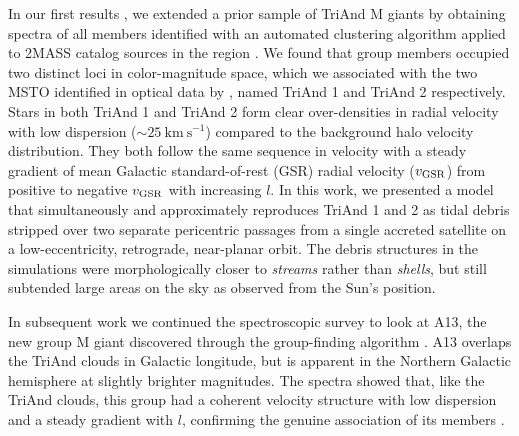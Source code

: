 \documentclass[galaxies,article,submit,moreauthors,pdftex,10pt,a4paper]{mdpi}
\newcommand{\kms}{\mathrm{km}~\mathrm{s}^{-1}}
\begin{document}
In our first results \cite{sheffield14}, we extended a prior sample of TriAnd
M giants \cite{rochapinto04} by obtaining spectra of all members identified
with an automated clustering algorithm applied to 2MASS catalog sources in the
region \cite{sharma10}.
We found that group members occupied two distinct loci in color-magnitude space, which we associated with the two MSTO identified in optical data by \cite{martin07}, named TriAnd 1 and TriAnd 2 respectively.
Stars in both TriAnd 1 and TriAnd 2  form  clear over-densities in radial velocity with low dispersion ($\sim 25~\kms$) compared to the background halo velocity distribution.
They both follow the same  sequence in velocity with a steady gradient of mean Galactic standard-of-rest (GSR) radial velocity ($v_{\rm GSR}$) from positive to negative $v_{\rm GSR}$ with increasing $l$.
In this work, we presented a model that simultaneously and approximately reproduces TriAnd 1 and 2 as tidal debris stripped over two separate pericentric passages from a single accreted satellite on a low-eccentricity, retrograde, near-planar orbit.
The debris structures in the simulations were morphologically closer to {\it streams} rather
than {\it shells}, but still subtended large areas on the sky as observed from
the Sun's position.

In subsequent work we continued the spectroscopic survey to look at A13, the new group M giant discovered through the group-finding algorithm \cite{sharma10}. A13 overlaps the TriAnd clouds in Galactic longitude, but is apparent in the Northern Galactic hemisphere at slightly brighter magnitudes. The spectra showed that, like the TriAnd clouds, this  group had a coherent velocity structure with low dispersion and a steady gradient with $l$, confirming the genuine association of its members \cite{li17}.
\end{document}
